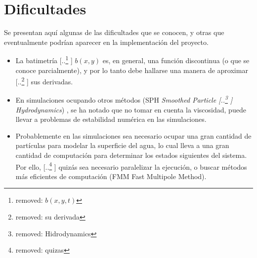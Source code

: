 \documentclass[spanish]{article} %
\providecommand{\DIFaddtex}[1]{{\protect\color{blue} \sf #1}} %
\providecommand{\DIFdeltex}[1]{{\protect\color{red} [..\footnote{removed: #1} ]}} %
\providecommand{\DIFaddbegin}{} %
\providecommand{\DIFaddend}{} %
\providecommand{\DIFdelbegin}{} %
\providecommand{\DIFdelend}{} %
\providecommand{\DIFadd}[1]{\texorpdfstring{\DIFaddtex{#1}}{#1}} %
\providecommand{\DIFdel}[1]{\texorpdfstring{\DIFdeltex{#1}}{}} %
\begin{document}
\section{Dificultades}
Se presentan aquí algunas de las dificultades que se conocen, y otras que eventualmente podrían aparecer en la implementación
del proyecto.
\begin{itemize}
    \item La batimetría \DIFdelbegin \DIFdel{$b(x,y,t)$ }\DIFdelend \DIFaddbegin \DIFadd{$b(x,y)$ }\DIFaddend es, en general, una función discontinua (o que se conoce parcialmente), y por lo tanto
    debe hallarse una manera de aproximar \DIFdelbegin \DIFdel{su derivada}\DIFdelend \DIFaddbegin \DIFadd{sus derivadas}\DIFaddend .
    \item En simulaciones ocupando otros métodos (SPH \textit{Smoothed Particle \DIFdelbegin \DIFdel{Hidrodynamics}\DIFdelend \DIFaddbegin \DIFadd{Hydrodynamics}\DIFaddend })\DIFaddbegin \DIFadd{, }\DIFaddend se ha notado que no tomar
    en cuenta la viscosidad, puede llevar a problemas de estabilidad numérica en las simulaciones.
    \item Probablemente en las simulaciones sea necesario ocupar una gran cantidad de partículas para modelar la superficie
    del agua, lo cual lleva a una gran cantidad de computación para determinar los estados siguientes del sistema. Por ello,
    \DIFdelbegin \DIFdel{quizas }\DIFdelend \DIFaddbegin \DIFadd{quizás }\DIFaddend sea necesario paralelizar la ejecución, o buscar métodos más eficientes de computación (FMM Fast Multipole
    Method).
\end{itemize}                                                                                                                                                                                                                                                                                                                                                                                                     
\newpage  
\end{document}
